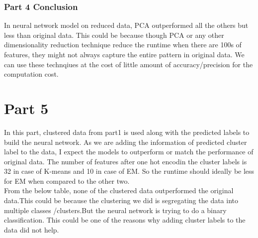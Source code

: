 \documentclass[12pt]{article}
\begin{document}
\subsubsection*{Part 4 Conclusion}
In neural network model on reduced data, PCA outperformed all the others but less than original data. This could be because though PCA or any other dimensionality reduction technique reduce the runtime when there are 100s of features, they might not always capture the entire pattern in original data. We can use these technqiues at the cost of little amount of accuracy/precision for the computation cost.


\section{Part 5}
In this part, clustered data from part1 is used along with the predicted labels to build the neural network. As we are adding the information of predicted cluster label to the data, I expect the models to outperform or match the performance of original data. The number of features after one hot encodin the cluster labels is 32 in case of K-means and 10 in case of EM. So the runtime should ideally be less for EM when compared to the other two.\\

From the below table, none of the clustered data outperformed the original data.This could be because the clustering we did is segregating the data into multiple classes /clusters.But the neural network is trying to do a binary classification. This could be one of the reasons why adding cluster labels to the data did not help.

\begin{figure}[htbp]
    \centering
     \label{fig:foobar}
\end{figure}
\end{document}
